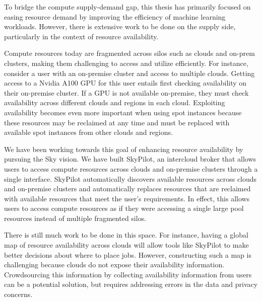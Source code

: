 To bridge the compute supply-demand gap, this thesis has primarily focused on easing resource demand by improving the efficiency of machine learning workloads. However, there is extensive work to be done on the supply side, particularly in the context of resource availability.

Compute resources today are fragmented across silos such as clouds and on-prem clusters, making them challenging to access and utilize efficiently. For instance, consider a user with an on-premise cluster and access to multiple clouds. Getting access to a Nvidia A100 GPU for this user entails first checking availability on their on-premise cluster. If a GPU is not available on-premise, they must check availability across different clouds and regions in each cloud. Exploiting availability becomes even more important when using spot instances because these resources may be reclaimed at any time and must be replaced with available spot instances from other clouds and regions.

We have been working towards this goal of enhancing resource availability by pursuing the Sky\cite{skyhotos} vision. We have built SkyPilot\cite{skypilot}, an intercloud broker that allows users to access compute resources across clouds and on-premise clusters through a single interface. SkyPilot automatically discovers available resources across clouds and on-premise clusters and automatically replaces resources that are reclaimed with available resources that meet the user's requirements. In effect, this allows users to access compute resources as if they were accessing a single large pool resources instead of multiple fragmented silos.

There is still much work to be done in this space. For instance, having a global map of resource availability across clouds will allow tools like SkyPilot to make better decisions about where to place jobs. However, constructing such a map is challenging because clouds do not expose their availability information. Crowdsourcing this information by collecting availability information from users can be a potential solution, but requires addressing errors in the data and privacy concerns. 

